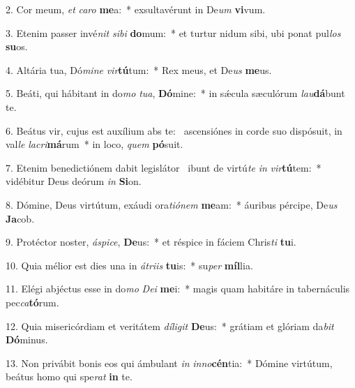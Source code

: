 2. Cor meum, \textit{et} \textit{ca}\textit{ro} \textbf{me}a:~*  exsultavérunt in De\textit{um} \textbf{vi}vum.\

3. Etenim passer invé\textit{nit} \textit{si}\textit{bi} \textbf{do}mum:~*  et turtur nidum sibi, ubi ponat pul\textit{los} \textbf{su}os.\

4. Altária tua, Dó\textit{mi}\textit{ne} \textit{vir}\textbf{tú}tum:~*  Rex meus, et De\textit{us} \textbf{me}us.\

5. Beáti, qui hábitant in do\textit{mo} \textit{tu}\textit{a}, \textbf{Dó}mine:~*  in sǽcula sæculórum \textit{lau}\textbf{dá}bunt te.\

6. Beátus vir, cujus est auxílium abs te: \dag\  ascensiónes in corde suo dispósuit, in val\textit{le} \textit{la}\textit{cri}\textbf{má}rum~*  in loco, \textit{quem} \textbf{pó}suit.\

7. Etenim benedictiónem dabit legislátor \dag\  ibunt de virtú\textit{te} \textit{in} \textit{vir}\textbf{tú}tem:~*  vidébitur Deus deórum \textit{in} \textbf{Si}on.\

8. Dómine, Deus virtútum, exáudi ora\textit{ti}\textit{ó}\textit{nem} \textbf{me}am:~*  áuribus pércipe, De\textit{us} \textbf{Ja}cob.\

9. Protéctor noster, \textit{á}\textit{spi}\textit{ce}, \textbf{De}us:~*  et réspice in fáciem Chris\textit{ti} \textbf{tu}i.\

10. Quia mélior est dies una in \textit{á}\textit{tri}\textit{is} \textbf{tu}is:~*  su\textit{per} \textbf{míl}lia.\

11. Elégi abjéctus esse in do\textit{mo} \textit{De}\textit{i} \textbf{me}i:~*  magis quam habitáre in tabernáculis pec\textit{ca}\textbf{tó}rum.\

12. Quia misericórdiam et veritátem \textit{dí}\textit{li}\textit{git} \textbf{De}us:~*  grátiam et glóriam da\textit{bit} \textbf{Dó}minus.\

13. Non privábit bonis eos qui ámbulant \textit{in} \textit{in}\textit{no}\textbf{cén}tia:~*  Dómine virtútum, beátus homo qui spe\textit{rat} \textbf{in} te.\

